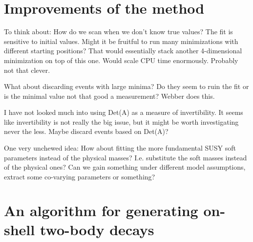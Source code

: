 \documentclass[twoside,english]{uiofysmaster}
\begin{document}
\chapter{Improvements of the method}
To think about: How do we scan when we don't know true values? The fit is sensitive to initial values. Might it be fruitful to run many minimizations with different starting positions? That would essentially stack another 4-dimensional minimization on top of this one. Would scale CPU time enormously. Probably not that clever.

What about discarding events with large minima? Do they seem to ruin the fit or is the minimal value not that good a measurement? Webber does this. 

I have not looked much into using Det(A) as a measure of invertibility. It seems like invertibility is not really the big issue, but it might be worth investigating never the less. Maybe discard events based on Det(A)?

One very unchewed idea: How about fitting the more fundamental SUSY soft parameters instead of the physical masses? I.e. substitute the soft masses instead of the physical ones? Can we gain something under different model assumptions, extract some co-varying parameters or something?

\appendix

\chapter{An algorithm for generating on-shell two-body decays}
\label{ch:decayalgorithm}
\end{document}
